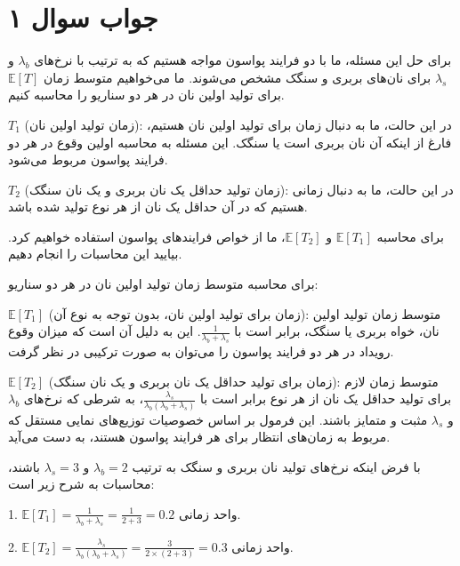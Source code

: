 \section*{جواب سوال ۱}

برای حل این مسئله، ما با دو فرایند پواسون مواجه هستیم که به ترتیب با نرخ‌های \( \lambda_b \) و \( \lambda_s \) برای نان‌های بربری و سنگک مشخص می‌شوند. ما می‌خواهیم متوسط زمان \( \mathbb{E}[T] \) برای تولید اولین نان در هر دو سناریو را محاسبه کنیم.

\( T_1 \) (زمان تولید اولین نان): در این حالت، ما به دنبال زمان برای تولید اولین نان هستیم، فارغ از اینکه آن نان بربری است یا سنگک. این مسئله به محاسبه اولین وقوع در هر دو فرایند پواسون مربوط می‌شود.

\( T_2 \) (زمان تولید حداقل یک نان بربری و یک نان سنگک): در این حالت، ما به دنبال زمانی هستیم که در آن حداقل یک نان از هر نوع تولید شده باشد.

برای محاسبه \( \mathbb{E}[T_1] \) و \( \mathbb{E}[T_2] \)، ما از خواص فرایندهای پواسون استفاده خواهیم کرد. بیایید این محاسبات را انجام دهیم.

برای محاسبه متوسط زمان تولید اولین نان در هر دو سناریو:

\( \mathbb{E}[T_1] \) (زمان برای تولید اولین نان، بدون توجه به نوع آن): متوسط زمان تولید اولین نان، خواه بربری یا سنگک، برابر است با \( \frac{1}{\lambda_b + \lambda_s} \). این به دلیل آن است که میزان وقوع رویداد در هر دو فرایند پواسون را می‌توان به صورت ترکیبی در نظر گرفت.

\( \mathbb{E}[T_2] \) (زمان برای تولید حداقل یک نان بربری و یک نان سنگک): متوسط زمان لازم برای تولید حداقل یک نان از هر نوع برابر است با \( \frac{\lambda_s}{\lambda_b(\lambda_b + \lambda_s)} \)، به شرطی که نرخ‌های \( \lambda_b \) و \( \lambda_s \) مثبت و متمایز باشند. این فرمول بر اساس خصوصیات توزیع‌های نمایی مستقل که مربوط به زمان‌های انتظار برای هر فرایند پواسون هستند، به دست می‌آید.

با فرض اینکه نرخ‌های تولید نان بربری و سنگک به ترتیب \( \lambda_b = 2 \) و \( \lambda_s = 3 \) باشند، محاسبات به شرح زیر است:

1. \( \mathbb{E}[T_1] = \frac{1}{\lambda_b + \lambda_s} = \frac{1}{2 + 3} = 0.2 \) واحد زمانی.

2. \( \mathbb{E}[T_2] = \frac{\lambda_s}{\lambda_b(\lambda_b + \lambda_s)} = \frac{3}{2 \times (2 + 3)} = 0.3 \) واحد زمانی.